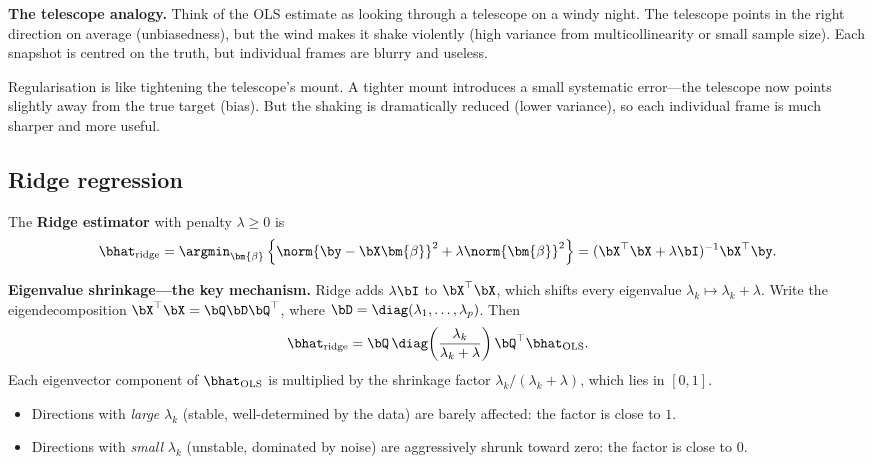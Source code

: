 \medskip
\noindent\textbf{The telescope analogy.}
Think of the OLS estimate as looking through a telescope on a windy night.
The telescope points in the right direction on average (unbiasedness),
but the wind makes it shake violently (high variance from
multicollinearity or small sample size).
Each snapshot is centred on the truth, but individual frames are blurry
and useless.

Regularisation is like tightening the telescope's mount.
A tighter mount introduces a small systematic error---the telescope
now points slightly away from the true target (bias).
But the shaking is dramatically reduced (lower variance), so each
individual frame is much sharper and more useful.


\subsection{Ridge regression}

\begin{definition}
The \textbf{Ridge estimator} with penalty $\lambda\ge 0$ is
\[
  \bhat_{\text{ridge}}
  = \argmin_{\bm{\beta}}\left\{
      \norm{\by-\bX\bm{\beta}}^2 + \lambda\norm{\bm{\beta}}^2
    \right\}
  = (\bX^\top\bX + \lambda\bI)^{-1}\bX^\top\by.
\]
\end{definition}

\noindent\textbf{Eigenvalue shrinkage---the key mechanism.}
Ridge adds $\lambda\bI$ to $\bX^\top\bX$, which shifts every eigenvalue
$\lambda_k\mapsto\lambda_k+\lambda$.
Write the eigendecomposition $\bX^\top\bX = \bQ\bD\bQ^\top$, where
$\bD = \diag(\lambda_1,\dots,\lambda_p)$.
Then
\begin{equation}\label{eq:ridge-eigen}
  \bhat_{\text{ridge}}
  = \bQ\,\diag\!\left(\frac{\lambda_k}{\lambda_k+\lambda}\right)\bQ^\top
    \bhat_{\text{OLS}}.
\end{equation}
Each eigenvector component of $\bhat_{\text{OLS}}$ is multiplied by the
shrinkage factor $\lambda_k/(\lambda_k+\lambda)$, which lies in $[0,1]$.
\begin{itemize}[nosep]
  \item Directions with \emph{large} $\lambda_k$ (stable, well-determined
        by the data) are barely affected: the factor is close to $1$.
  \item Directions with \emph{small} $\lambda_k$ (unstable, dominated by
        noise) are aggressively shrunk toward zero: the factor is close
        to $0$.
\end{itemize}

